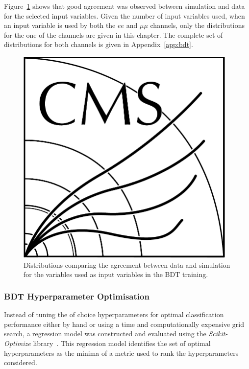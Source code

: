 Figure~\ref{fig:inputFeaturesDataSimAgreement} shows that good agreement was observed between simulation and data for the selected input variables.
Given the number of input variables used, when an input variable is used by both the $ee$ and $\mu\mu$ channels, only the distributions for the one of the channels are given in this chapter.
The complete set of distributions for both channels is given in Appendix~\ref{app:bdt}.

\begin{figure}[htbp]
\centering
\includegraphics[width=0.97\textwidth]{CMS-bw-logo.pdf}
\caption{
Distributions comparing the agreement between data and simulation for the variables used as input variables in the BDT training.}
\label{fig:inputFeaturesDataSimAgreement}
\end{figure}

\subsubsection*{BDT Hyperparameter Optimisation}
Instead of tuning the of choice hyperparameters for optimal classification performance either by hand or using a time and computationally expensive grid search, a regression model was constructed and evaluated using the \emph{Scikit-Optimize} library~\cite{scikit-optimise}.
This regression model identifies the set of optimal hyperparameters as the minima of a metric used to rank the hyperparameters considered.
 
